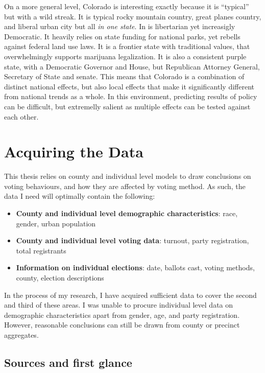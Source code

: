 \documentclass[12pt,twoside]{reedthesis}
\begin{document}
  On a more general level, Colorado is interesting exactly because it is
  ``typical'' but with a wild streak. It is typical rocky mountain
  country, great planes country, and liberal urban city but all \emph{in
  one state}. In is libertarian yet increasigly Democratic. It heavily
  relies on state funding for national parks, yet rebells against federal
  land use laws. It is a frontier state with traditional values, that
  overwhelmingly supports marijuana legalization. It is also a consistent
  purple state, with a Democratic Governor and House, but Republican
  Attorney General, Secretary of State and senate. This means that
  Colorado is a combination of distinct national effects, but also local
  effects that make it significantly different from national trends as a
  whole. In this environment, predicting results of policy can be
  difficult, but extremelly salient as multiple effects can be tested
  against each other.
  
  \section{Acquiring the Data}\label{acquiring-the-data}
  
  This thesis relies on county and individual level models to draw
  conclusions on voting behaviours, and how they are affected by voting
  method. As such, the data I need will optimally contain the following:
  
  \begin{itemize}
  \item
    \textbf{County and individual level demographic characteristics}:
    race, gender, urban population
  \item
    \textbf{County and individual level voting data}: turnout, party
    registration, total registrants
  \item
    \textbf{Information on individual elections}: date, ballots cast,
    voting methods, county, election descriptions
  \end{itemize}
  
  In the process of my research, I have acquired sufficient data to cover
  the second and third of these areas. I was unable to procure individual
  level data on demographic characteristics apart from gender, age, and
  party registration. However, reasonable conclusions can still be drawn
  from county or precinct aggregates.
  
  \subsection{Sources and first glance}\label{sources-and-first-glance}
  
\end{document}
